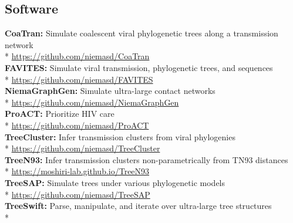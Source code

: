 \documentclass[margin,line]{res}
\begin{document}
\begin{resume}
\section{\sc Software}
\textbf{CoaTran:} Simulate coalescent viral phylogenetic trees along a transmission network\\*\vspace{2mm}
\hspace*{4mm} \href{https://github.com/niemasd/CoaTran}{https://github.com/niemasd/CoaTran}\\
\textbf{FAVITES:} Simulate viral transmission, phylogenetic trees, and sequences\\*\vspace{2mm}
\hspace*{4mm} \href{https://github.com/niemasd/FAVITES}{https://github.com/niemasd/FAVITES}\\
\textbf{NiemaGraphGen:} Simulate ultra-large contact networks\\*\vspace{2mm}
\hspace*{4mm} \href{https://github.com/niemasd/NiemaGraphGen}{https://github.com/niemasd/NiemaGraphGen}\\
\textbf{ProACT:} Prioritize HIV care\\*\vspace{2mm}
\hspace*{4mm} \href{https://github.com/niemasd/ProACT}{https://github.com/niemasd/ProACT}\\
\textbf{TreeCluster:} Infer transmission clusters from viral phylogenies\\*\vspace{2mm}
\hspace*{4mm} \href{https://github.com/niemasd/TreeCluster}{https://github.com/niemasd/TreeCluster}\\
\textbf{TreeN93:} Infer transmission clusters non-parametrically from TN93 distances\\*\vspace{2mm}
\hspace*{4mm} \href{https://moshiri-lab.github.io/TreeN93}{https://moshiri-lab.github.io/TreeN93}\\
\textbf{TreeSAP:} Simulate trees under various phylogenetic models\\*\vspace{2mm}
\hspace*{4mm} \href{https://github.com/niemasd/TreeSAP}{https://github.com/niemasd/TreeSAP}\\
\textbf{TreeSwift:} Parse, manipulate, and iterate over ultra-large tree structures\\*\vspace{2mm}

\end{resume}
\end{document}
